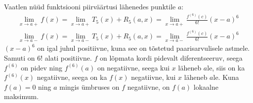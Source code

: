 \documentclass{article}
\begin{document}
Vaatlen n\"u\"ud funktsiooni piirv\"a\"artusi l\"ahenedes punktile $a$:
\begin{equation*}
\begin{aligned}
\lim_{x\to a+}f(x)=\lim_{x\to a+}T_5(x)+R_5(a,x)=\lim_{x\to a+}\frac{f^{(6)}(c)}{6!}(x-a)^6\\
\lim_{x\to a-}f(x)=\lim_{x\to a-}T_5(x)+R_5(a,x)=\lim_{x\to a-}\frac{f^{(6)}(c)}{6!}(x-a)^6
\end{aligned}
\end{equation*}
$(x-a)^6$ on igal juhul positiivne, kuna see on tõstetud paarisarvulisele astmele. Samuti on 6! alati positiivne. $f$ on l\~opmata kordi pidevalt diferentseeruv, seega $f^{(6)}$ on pidev ning $f^{(6)}(a)$ on negatiivne, seega kui $x$ l\"aheneb $a$le, siis on ka $f^{(6)}(x)$ negatiivne, seega on ka $f(x)$ negatiivne, kui $x$ l\"aheneb $a$le. Kuna $f(a)=0$ ning $a$ mingis \"umbruses on $f$ negatiivne, on $f(a)$ lokaalne maksimum.
\end{document}
